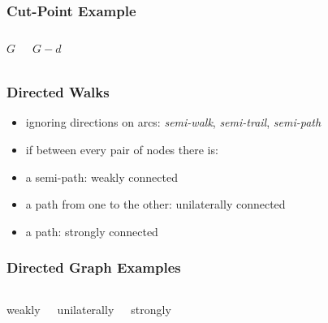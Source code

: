 \documentclass[dvipsnames]{beamer}
\begin{document}
\begin{frame}
  \frametitle{Cut-Point Example}

  \begin{columns}
    \begin{center}
      $G$

      \bigskip
    \end{center}

    \begin{center}
      $G-d$

      \bigskip
    \end{center}
  \end{columns}
\end{frame}

\begin{frame}
  \frametitle{Directed Walks}

  \begin{itemize}
    \item ignoring directions on arcs:
      \emph{semi-walk}, \emph{semi-trail}, \emph{semi-path}

    \bigskip
    \item if between every pair of nodes there is:
    \smallskip
    \item a semi-path: \alert{weakly} connected
    \item a path from one to the other: \alert{unilaterally} connected
    \item a path: \alert{strongly} connected
  \end{itemize}
\end{frame}

\begin{frame}
  \frametitle{Directed Graph Examples}

  \begin{columns}
    \begin{exampleblock}{weakly}
      \begin{center}
      \end{center}
    \end{exampleblock}

    \begin{exampleblock}{unilaterally}
      \begin{center}
      \end{center}
    \end{exampleblock}

    \begin{exampleblock}{strongly}
      \begin{center}
      \end{center}
    \end{exampleblock}
  \end{columns}
\end{frame}
\end{document}
